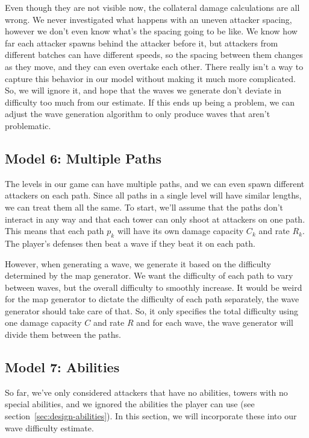 Even though they are not visible now, the collateral damage calculations are all wrong.
We never investigated what happens with an uneven attacker spacing, however we don't even know what's the spacing going to be like.
We know how far each attacker spawns behind the attacker before it, but attackers from different batches can have different speeds, so the spacing between them changes as they move, and they can even overtake each other.
There really isn't a way to capture this behavior in our model without making it much more complicated.
So, we will ignore it, and hope that the waves we generate don't deviate in difficulty too much from our estimate.
If this ends up being a problem, we can adjust the wave generation algorithm to only produce waves that aren't problematic.

\subsection{Model 6: Multiple Paths}\label{sec:analysis-waves-paths}
The levels in our game can have multiple paths, and we can even spawn different attackers on each path.
Since all paths in a single level will have similar lengths, we can treat them all the same.
To start, we'll assume that the paths don't interact in any way and that each tower can only shoot at attackers on one path.
This means that each path $p_k$ will have its own damage capacity $C_k$ and rate $R_k$.
The player's defenses then beat a wave if they beat it on each path.

However, when generating a wave, we generate it based on the difficulty determined by the map generator.
We want the difficulty of each path to vary between waves, but the overall difficulty to smoothly increase.
It would be weird for the map generator to dictate the difficulty of each path separately, the wave generator should take care of that.
So, it only specifies the total difficulty using one damage capacity $C$ and rate $R$ and for each wave, the wave generator will divide them between the paths.

\subsection{Model 7: Abilities}
So far, we've only considered attackers that have no abilities, towers with no special abilities, and we ignored the abilities the player can use (see section~\ref{sec:design-abilities}).
In this section, we will incorporate these into our wave difficulty estimate.


